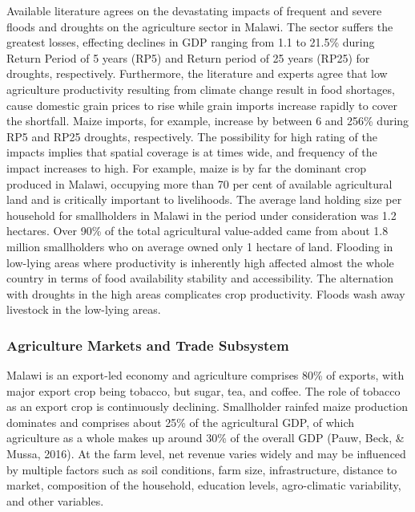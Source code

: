 \documentclass[
]{book}
\begin{document}
Available literature agrees on the devastating impacts of frequent and severe floods and droughts on the agriculture sector in Malawi. The sector suffers the greatest losses, effecting declines in GDP ranging from 1.1 to 21.5\% during Return Period of 5 years (RP5) and Return period of 25 years (RP25) for droughts, respectively. Furthermore, the literature and experts agree that low agriculture productivity resulting from climate change result in food shortages, cause domestic grain prices to rise while grain imports increase rapidly to cover the shortfall. Maize imports, for example, increase by between 6 and 256\% during RP5 and RP25 droughts, respectively. The possibility for high rating of the impacts implies that spatial coverage is at times wide, and frequency of the impact increases to high. For example, maize is by far the dominant crop produced in Malawi, occupying more than 70 per cent of available agricultural land and is critically important to livelihoods. The average land holding size per household for smallholders in Malawi in the period under consideration was 1.2 hectares. Over 90\% of the total agricultural value-added came from about 1.8 million smallholders who on average owned only 1 hectare of land. Flooding in low-lying areas where productivity is inherently high affected almost the whole country in terms of food availability stability and accessibility. The alternation with droughts in the high areas complicates crop productivity. Floods wash away livestock in the low-lying areas.

\hypertarget{agriculture-markets-and-trade-subsystem}{%
\subsubsection{Agriculture Markets and Trade Subsystem}\label{agriculture-markets-and-trade-subsystem}}

Malawi is an export-led economy and agriculture comprises 80\% of exports, with major export crop being tobacco, but sugar, tea, and coffee. The role of tobacco as an export crop is continuously declining. Smallholder rainfed maize production dominates and comprises about 25\% of the agricultural GDP, of which agriculture as a whole makes up around 30\% of the overall GDP (Pauw, Beck, \& Mussa, 2016). At the farm level, net revenue varies widely and may be influenced by multiple factors such as soil conditions, farm size, infrastructure, distance to market, composition of the household, education levels, agro-climatic variability, and other variables.
\end{document}
